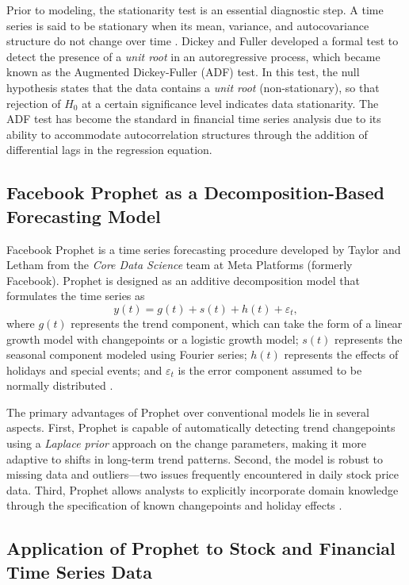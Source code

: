 \documentclass[11pt,twoside]{article}
\begin{document}
Prior to modeling, the stationarity test is an essential diagnostic step. A time series is said to be stationary when its mean, variance, and autocovariance structure do not change over time \cite{Hyndman2018}. Dickey and Fuller \cite{Dickey1979} developed a formal test to detect the presence of a \textit{unit root} in an autoregressive process, which became known as the Augmented Dickey-Fuller (ADF) test. In this test, the null hypothesis states that the data contains a \textit{unit root} (non-stationary), so that rejection of $H_0$ at a certain significance level indicates data stationarity. The ADF test has become the standard in financial time series analysis due to its ability to accommodate autocorrelation structures through the addition of differential lags in the regression equation.

\subsection{Facebook Prophet as a Decomposition-Based Forecasting Model}

Facebook Prophet is a time series forecasting procedure developed by Taylor and Letham \cite{Taylor2018} from the \textit{Core Data Science} team at Meta Platforms (formerly Facebook). Prophet is designed as an additive decomposition model that formulates the time series as
\begin{equation}
    y(t) = g(t) + s(t) + h(t) + \varepsilon_t,
    \label{Eq:Prophet}
\end{equation}
where $g(t)$ represents the trend component, which can take the form of a linear growth model with changepoints or a logistic growth model; $s(t)$ represents the seasonal component modeled using Fourier series; $h(t)$ represents the effects of holidays and special events; and $\varepsilon_t$ is the error component assumed to be normally distributed \cite{Taylor2018}.

The primary advantages of Prophet over conventional models lie in several aspects. First, Prophet is capable of automatically detecting trend changepoints using a \textit{Laplace prior} approach on the change parameters, making it more adaptive to shifts in long-term trend patterns. Second, the model is robust to missing data and outliers—two issues frequently encountered in daily stock price data. Third, Prophet allows analysts to explicitly incorporate domain knowledge through the specification of known changepoints and holiday effects \cite{Taylor2018}.

\subsection{Application of Prophet to Stock and Financial Time Series Data}
\end{document}
